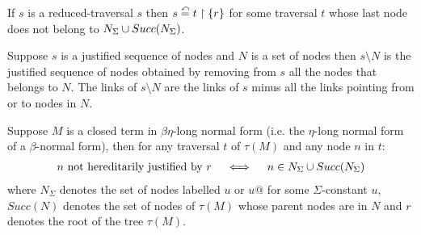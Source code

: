 \begin{rem}
\label{rem:redtrav}
If $s$ is a reduced-traversal $s$ then $s \stackrel{\curvearrowleft}{=} t \upharpoonright \{ r \}$ for some
traversal $t$ whose last node does not belong to $N_\Sigma \cup Succ(N_\Sigma)$.
\end{rem}

\begin{dfn}
Suppose $s$ is a justified sequence of nodes and $N$ is a set of nodes then $s \setminus N$ is the justified sequence of nodes
obtained by removing from $s$ all the nodes that belongs to $N$.
The links of $s \setminus N$ are the links of $s$ minus all the links pointing from or to nodes in $N$.
\end{dfn}

\begin{property}
\label{proper:betaeta_trav}
Suppose $M$ is a closed term in $\beta \eta$-long normal form (i.e. the $\eta$-long normal form of a $\beta$-normal form), then
for any traversal $t$ of $\tau(M)$ and any node $n$ in $t$:
\begin{eqnarray*}
n \mbox{ not hereditarily justified by } r \quad \iff \quad  n \in N_\Sigma \cup Succ(N_\Sigma)
\end{eqnarray*}
where $N_\Sigma$ denotes the set of nodes labelled $u$ or $u@$ for some
$\Sigma$-constant $u$, $Succ(N)$ denotes the set of nodes of $\tau(M)$ whose parent nodes are
in $N$ and $r$ denotes the root of the tree $\tau(M)$.
\end{property}
